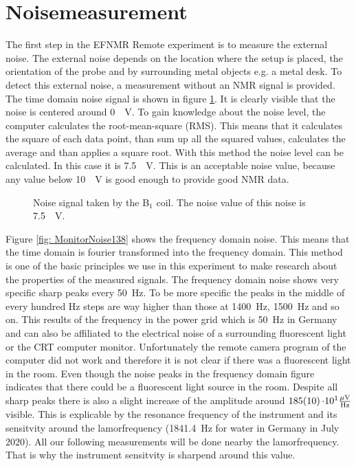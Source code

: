 \section{Noisemeasurement}
\label{sec:Noisemeasurement}
The first step in the EFNMR Remote experiment is to measure the external noise. The external noise depends on the location where the setup is placed, the orientation of the probe and by surrounding metal objects e.g. a metal desk. To detect this external noise, a measurement without an NMR signal is provided. The time domain noise signal is shown in figure \ref{fig: noise}. It is clearly visible that the noise is centered around \SI{0}{\mu \volt}. To gain knowledge about the noise level, the computer calculates the root-mean-square (RMS). This means that it calculates the square of each data point, than sum up all the squared values, calculates the average and than applies a square root. With this method the noise level can be calculated. In this case it is \SI{7.5}{\mu \volt}. This is an acceptable noise value, because any value below \SI{10}{\mu \volt} is good enough to provide good NMR data.

\begin{figure}[H]
    \centering
    
    \caption[Noise signal taken by the B$_1$ coil.]{Noise signal taken by the B$_1$ coil. The noise value of this noise is \SI{7.5}{\mu \volt}.}
    \label{fig: noise}
\end{figure}

Figure \ref{fig: MonitorNoise138} shows the frequency domain noise. This means that the time domain is fourier transformed into the frequency domain. This method is one of the basic principles we use in this experiment to make research about the properties of the measured signals. The frequency domain noise shows very specific sharp peaks every \SI{50}{\hertz}. To be more specific the peaks in the middle of every hundred \si{\hertz} steps are way higher than those at \SI{1400}{\hertz}, \SI{1500}{\hertz} and so on. This results of the frequency in the power grid which is \SI{50}{\hertz} in Germany and can also be affiliated to the electrical noise of a surrounding fluorescent light or the CRT computer monitor. Unfortunately the remote camera program of the computer did not work and therefore it is not clear if there was a fluorescent light in the room. Even though the noise peaks in the frequency domain figure indicates that there could be a fluorescent light source in the room.
Despite all sharp peaks there is also a slight increase of the amplitude around $\SI{185 \pm 10}{\cdot 10^1 \frac{\mu \volt}{\hertz}}$ visible. This is explicable by the resonance frequency of the instrument and its sensitvity around the lamorfrequency (\SI{1841.4}{\hertz} for water in Germany in July 2020). All our following measurements will be done nearby the lamorfrequency. That is why the instrument sensitvity is sharpend around this value.


